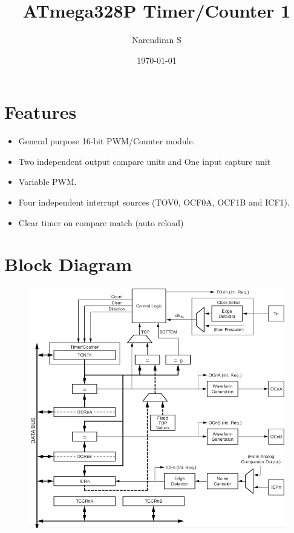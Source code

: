 \documentclass{article}
\title{ATmega328P Timer/Counter 1}
\author{Narendiran S}
\date{\today}
\begin{document}
\maketitle

\section{Features}
\begin{itemize}
    \item General purpose 16-bit PWM/Counter module.
    \item Two independent output compare units and One input capture unit
    \item Variable PWM.
    \item Four independent interrupt sources (TOV0, OCF0A, OCF1B and ICF1).
    \item Clear timer on compare match (auto reload)
\end{itemize}

\section{Block Diagram}
\begin{figure}[H]
    \begin{center}
        \includegraphics[height=0.6\textheight]{Timer1BlockDiagram.png}
    \end{center}
\end{figure}
\end{document}
